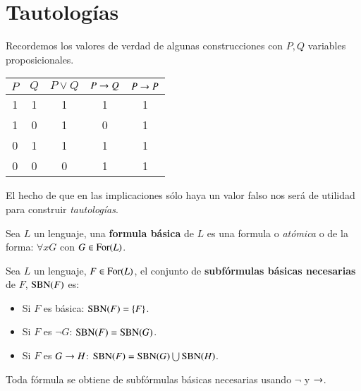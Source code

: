 
\chapter{Tautologías}

Recordemos los valores de verdad de algunas construcciones con $P, Q$ variables proposicionales.\\
\begin{center}
    \begin{table}[ht]
    \centering
    \begin{tabular}{c|c|c|c|c}
    $P$ & $Q$ & $P \lor Q$ & $P \rightarrow Q$ & $P \rightarrow P$ \\ \hline
    1   & 1   & 1          & 1           & 1           \\
    1   & 0   & 1          & 0           & 1           \\
    0   & 1   & 1          & 1           & 1           \\
    0   & 0   & 0          & 1           & 1
    \end{tabular}
    \end{table}
\end{center}

El hecho de que en las implicaciones sólo haya un valor falso nos será de utilidad para construir \textit{tautologías}.

\begin{dfn}
    Sea $L$ un lenguaje, una \textbf{formula básica} de $L$ es una formula o \textit{atómica} o de la forma: $\forall x G$ con $G \in \mathrm{For}(L)$.
\end{dfn}

\begin{dfn}
    Sea $L$ un lenguaje, $F \in \mathrm{For}(L)$, el conjunto de \textbf{subfórmulas básicas necesarias} de $F$, $\mathrm{SBN}(F)$ es:
    \begin{itemize}
        \item Si $F$ es básica: $\mathrm{SBN}(F) = \left\{F\right\}$.
        \item Si $F$ es $\neg G$: $\mathrm{SBN}(F) = \mathrm{SBN}(G)$.
        \item Si $F$ es $G \rightarrow H$: $\mathrm{SBN}(F) = \mathrm{SBN}(G) \bigcup \mathrm{SBN}(H)$.
    \end{itemize}
\end{dfn}

\begin{obs}
    Toda fórmula se obtiene de subfórmulas básicas necesarias usando $\neg$ y $\rightarrow$.
\end{obs}

